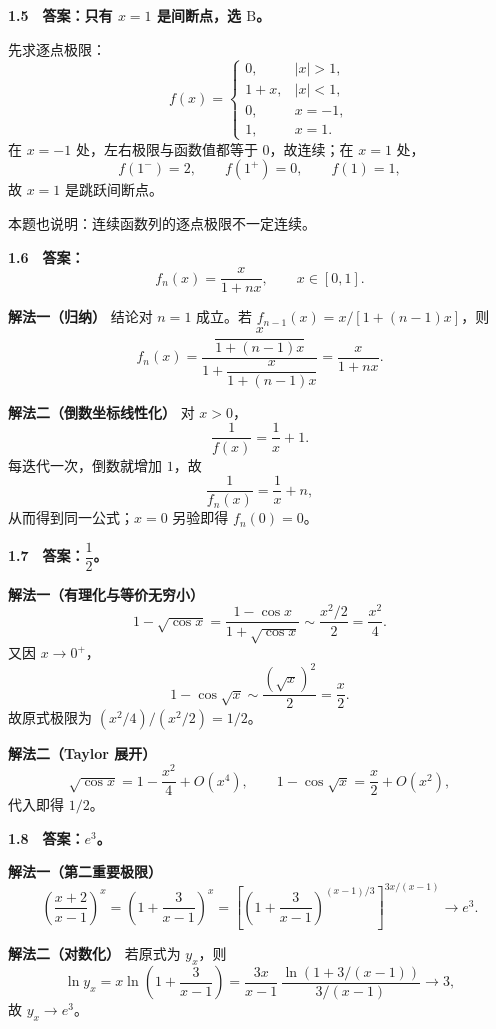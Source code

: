 \begin{solutionBox}
\textbf{1.5　答案：只有 \(x=1\) 是间断点，选 \(\mathrm B\)。}

先求逐点极限：
\[
f(x)=
\begin{cases}
0,&|x|>1,\\
1+x,&|x|<1,\\
0,&x=-1,\\
1,&x=1.
\end{cases}
\]
在 \(x=-1\) 处，左右极限与函数值都等于 \(0\)，故连续；在
\(x=1\) 处，
\[
f(1^-)=2,\qquad f(1^+)=0,\qquad f(1)=1,
\]
故 \(x=1\) 是跳跃间断点。

本题也说明：连续函数列的逐点极限不一定连续。
\end{solutionBox}

\begin{solutionBox}
\textbf{1.6　答案：}
\[
\boxed{f_n(x)=\frac{x}{1+nx}},\qquad x\in[0,1].
\]

\textbf{解法一（归纳）}
结论对 \(n=1\) 成立。若
\(f_{n-1}(x)=x/[1+(n-1)x]\)，则
\[
f_n(x)
=\frac{\dfrac{x}{1+(n-1)x}}
       {1+\dfrac{x}{1+(n-1)x}}
=\frac{x}{1+nx}.
\]

\textbf{解法二（倒数坐标线性化）}
对 \(x>0\)，
\[
\frac1{f(x)}=\frac1x+1.
\]
每迭代一次，倒数就增加 \(1\)，故
\[
\frac1{f_n(x)}=\frac1x+n,
\]
从而得到同一公式；\(x=0\) 另验即得 \(f_n(0)=0\)。
\end{solutionBox}

\begin{solutionBox}
\textbf{1.7　答案：\(\dfrac12\)。}

\textbf{解法一（有理化与等价无穷小）}
\[
1-\sqrt{\cos x}=\frac{1-\cos x}{1+\sqrt{\cos x}}
\sim\frac{x^2/2}{2}=\frac{x^2}{4}.
\]
又因 \(x\to0^+\)，
\[
1-\cos\sqrt{x}\sim\frac{(\sqrt{x})^2}{2}=\frac{x}{2}.
\]
故原式极限为 \((x^2/4)/(x^2/2)=1/2\)。

\textbf{解法二（Taylor 展开）}
\[
\sqrt{\cos x}=1-\frac{x^2}{4}+O(x^4),
\qquad
1-\cos\sqrt{x}=\frac{x}{2}+O(x^2),
\]
代入即得 \(1/2\)。
\end{solutionBox}

\begin{solutionBox}
\textbf{1.8　答案：\(e^3\)。}

\textbf{解法一（第二重要极限）}
\[
\left(\frac{x+2}{x-1}\right)^x
=\left(1+\frac3{x-1}\right)^x
=\left[\left(1+\frac3{x-1}\right)^{(x-1)/3}\right]^{3x/(x-1)}
\longrightarrow e^3.
\]

\textbf{解法二（对数化）}
若原式为 \(y_x\)，则
\[
\ln y_x=x\ln\left(1+\frac3{x-1}\right)
=\frac{3x}{x-1}\,
\frac{\ln(1+3/(x-1))}{3/(x-1)}\to3,
\]
故 \(y_x\to e^3\)。
\end{solutionBox}

